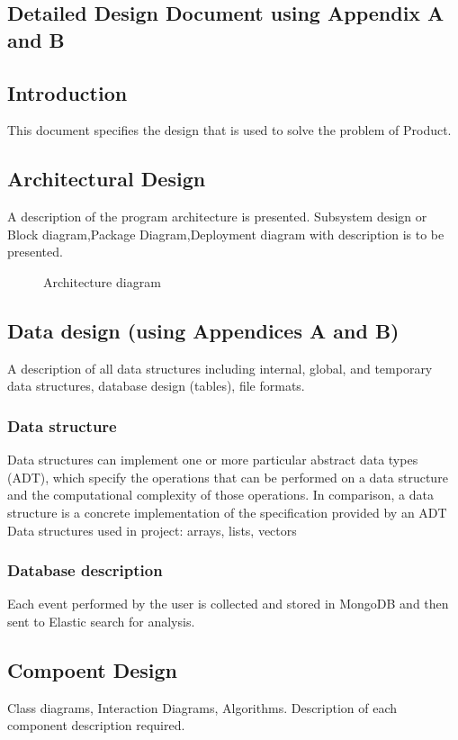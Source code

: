 \documentclass[oneside,a4paper,12pt]{book}
\begin{document}
\begin{enumerate}
\begin{itemize}
\chapter{Detailed Design Document using Appendix A and B}
 \section{Introduction}  
This document specifies the design that is used to solve the problem of Product.  
\section{Architectural Design}  
	A description of the program architecture is presented. Subsystem design or Block diagram,Package Diagram,Deployment diagram with description is to be presented.

 
  \begin{center}
	\begin{figure}[!htbp]
		\centering
	  \caption{Architecture diagram}
	  \label{fig:arch-dig}
	\end{figure}
\end{center} 


\section{Data design (using Appendices A and B)}   
A description of all data structures including internal, global, and temporary data structures, database design (tables), file formats.
\subsection{Data structure}
Data structures can implement one or more particular abstract data types (ADT), which specify the operations that can be performed on a data structure and the computational complexity of those operations. In comparison, a data structure is a concrete implementation of the specification provided by an ADT
Data structures used in project: arrays, lists, vectors
\subsection{Database description}
Each event performed by the user is collected and stored in MongoDB and then sent to Elastic search for analysis. 

\section{Compoent Design} 
Class diagrams, Interaction Diagrams, Algorithms. Description of each component description required.

\end{itemize}
\end{enumerate}
\end{document}

